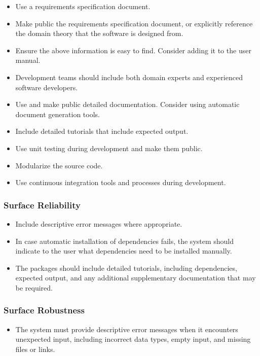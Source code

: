 \documentclass[12pt, notitlepage]{article}
\begin{document}
\begin{itemize}
	\item Use a requirements specification document.
	\item Make public the requirements specification document, or explicitly reference the domain theory that the software is designed from.
	\item Ensure the above information is easy to find. Consider adding it to the user manual. 
	\item Development teams should include both domain experts and experienced software developers.
	\item Use and make public detailed documentation. Consider using automatic document generation tools.
	\item Include detailed tutorials that include expected output.
	\item Use unit testing during development and make them public.
	\item Modularize the source code.
	\item Use continuous integration tools and processes during development.
\end{itemize}

\subsubsection{Surface Reliability}

\begin{itemize}
	\item Include descriptive error messages where appropriate.
	\item In case automatic installation of dependencies fails, the system should indicate to the user what dependencies need to be installed manually.
	\item The packages should include detailed tutorials, including dependencies, expected output, and any additional supplementary documentation that may be required.
\end{itemize}

\subsubsection{Surface Robustness}

\begin{itemize}
	\item The system must provide descriptive error messages when it encounters unexpected input, including incorrect data types, empty input, and missing files or links.
\end{itemize}
\end{document}
